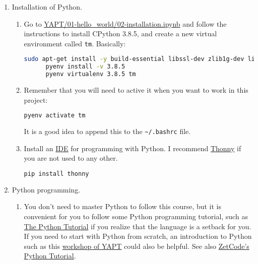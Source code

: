 \begin{enumerate}
  
\item Installation of Python.
  
  \begin{enumerate}
    
  \item Go to
    \href{https://github.com/vicente-gonzalez-ruiz/YAPT/blob/master/01-hello_world/02-installation.ipynb}{YAPT/01-hello\_world/02-installation.ipynb}
    \cite{YAPT} and follow the instructions to install CPython 3.8.5,
    and create a new virtual environment called \texttt{tm}. Basically:

    \begin{lstlisting}[language=Bash]
      sudo apt-get install -y build-essential libssl-dev zlib1g-dev libbz2-dev libreadline-dev libsqlite3-dev wget curl llvm libncurses5-dev libncursesw5-dev xz-utils tk-dev libffi-dev liblzma-dev python-openssl git
      pyenv install -v 3.8.5
      pyenv virtualenv 3.8.5 tm
    \end{lstlisting}

  \item Remember that you will need to active it when you want to
    work in this project:

    \begin{lstlisting}[language=Bash]
      pyenv activate tm
    \end{lstlisting}

    It is a good idea to append this to the \verb|~/.bashrc| file.
    
  \item Install an
    \href{https://en.wikipedia.org/wiki/Integrated_development_environment}{IDE}
    for programming with Python. I recommend
    \href{https://thonny.org/}{Thonny} if you are not used to any
    other.
    
    \begin{lstlisting}[language=Bash]
      pip install thonny
    \end{lstlisting}

  \end{enumerate}
  
\item Python programming.
  
  \begin{enumerate}
    
  \item You don't need to master Python to follow this course, but it
    is convenient for you to follow some Python programming tutorial,
    such as \href{https://docs.python.org/3/tutorial/}{The Python
    Tutorial} \cite{python-tutorial} if you realize that the language
    is a setback for you. If you need to start with Python from
    scratch, an introduction to Python such as
    this \href{https://github.com/vicente-gonzalez-ruiz/YAPT/tree/master/workshops/programacion_python_ESO}{workshop
    of YAPT} \cite{YAPT} could also be helpful. See
    also \href{http://zetcode.com/lang/python/}{ZetCode's Python
    Tutorial}.
    
  \end{enumerate}

\end{enumerate}

